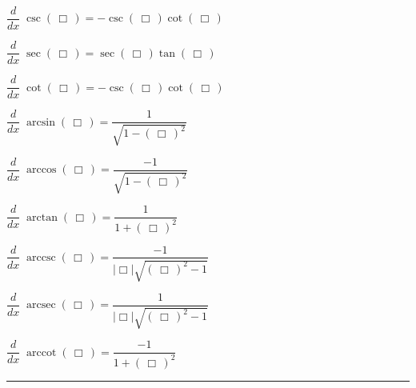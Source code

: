 \documentclass[11pt,letterpaper]{article}
\newenvironment{2enumerate}{%
	\begin{itemize}
	\begin{multicols}{2}
	}{%
	\end{multicols}
	\end{itemize}
}
\DeclareMathOperator{\arccsc}{arccsc}
\DeclareMathOperator{\arcsec}{arcsec}
\DeclareMathOperator{\arccot}{arccot}
\begin{document}
\begin{2enumerate}
\item $\dfrac{d}{dx}\; \csc \left(\, \Box \,\right) = -\csc \left(\, \Box \,\right) \cot \left(\, \Box \,\right)$ \par\vspace{0.05cm}
\item $\dfrac{d}{dx}\; \sec \left(\, \Box \,\right) = \sec \left(\, \Box \,\right) \tan \left(\, \Box \,\right)$ \par\vspace{0.05cm}
\item $\dfrac{d}{dx}\; \cot \left(\, \Box \,\right) =  -\csc \left(\, \Box \,\right) \cot \left(\, \Box \,\right)$ \par\vspace{0.05cm}
\item $\dfrac{d}{dx}\; \arcsin \left(\, \Box \,\right) = \dfrac{1}{\sqrt{1 - \left(\, \Box \,\right)^2}}$ \par\vspace{0.05cm}
\item $\dfrac{d}{dx}\; \arccos \left(\, \Box \,\right) = \dfrac{-1}{\sqrt{1 - \left(\, \Box \,\right)^2}}$ \par\vspace{0.05cm}
\item $\dfrac{d}{dx}\; \arctan \left(\, \Box \,\right) = \dfrac{1}{1 + \left(\, \Box \,\right)^2}$ \par\vspace{0.05cm}
\item $\dfrac{d}{dx}\; \arccsc \left(\, \Box \,\right) = \dfrac{-1}{| \Box | \sqrt{\left(\, \Box \,\right)^2 - 1}}$ \par\vspace{0.05cm}
\item $\dfrac{d}{dx}\; \arcsec \left(\, \Box \,\right) = \dfrac{1}{| \Box | \sqrt{\left(\, \Box \,\right)^2 - 1}}$ \par\vspace{0.05cm}
\item $\dfrac{d}{dx}\; \arccot \left(\, \Box \,\right) = \dfrac{-1}{1 + \left(\, \Box \,\right)^2}$ \par\vspace{0.05cm}
\end{2enumerate}

\noindent\rule{\textwidth}{1pt}
\end{document}
